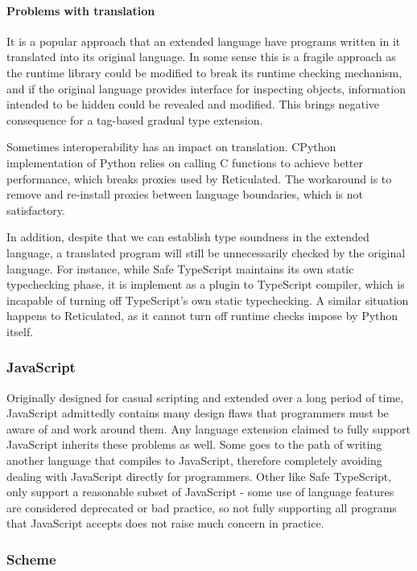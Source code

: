 \paragraph{Problems with translation}
It is a popular approach that an extended language have programs
written in it translated into its original language.
In some sense this is a fragile approach as the runtime library
could be modified to break its runtime checking mechanism,
and if the original language provides interface for inspecting
objects, information intended to be hidden could be
revealed and modified. This brings negative consequence for a tag-based
gradual type extension.

Sometimes interoperability has an impact on translation.
CPython implementation of Python relies on calling C functions to
achieve better performance, which breaks proxies used by Reticulated.
The workaround is to remove and re-install proxies
between language boundaries, which is not satisfactory.

In addition,
despite that we can establish type soundness in the extended language,
a translated program will still be unnecessarily checked by the original language.
For instance,
while Safe TypeScript maintains its own static typechecking phase,
it is implement as a plugin to TypeScript compiler, 
which is incapable of turning off TypeScript's own static typechecking.
A similar situation happens to Reticulated, as it cannot turn off
runtime checks impose by Python itself.

\subsubsection{JavaScript}

Originally designed for casual scripting and extended over a long period of time,
JavaScript admittedly contains many design flaws that
programmers must be aware of and work around them.
Any language extension claimed to fully support JavaScript inherits these problems as well.
Some goes to the path of writing another language that compiles to JavaScript,
therefore completely avoiding dealing with JavaScript directly for programmers.
Other like Safe TypeScript, only support a reasonable subset of JavaScript -
some use of language features are considered deprecated or bad practice,
so not fully supporting all programs that JavaScript accepts does not raise
much concern in practice.

\subsubsection{Scheme}

